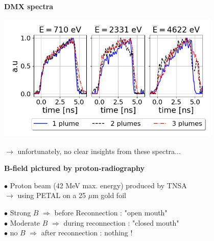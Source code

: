 \documentclass[landscape]{slides}
\begin{document}
\begin{slide}
{\large \textbf{DMX spectra}}

\begin{center}
\includegraphics[width=0.8\textwidth]{fig_DMX.png}
\end{center}

$\to$ unfortunately, no clear insights from these spectra...

\end{slide}



\begin{slide}
{\large \textbf{B-field pictured by proton-radiography}}

$\bullet$ Proton beam (42 MeV max. energy) produced by TNSA \\
$\to$ using PETAL on a 25 $\mu$m gold foil



$\bullet$ Strong $B$ $\Rightarrow$ before Reconnection : "open mouth" \\
$\bullet$ Moderate $B$ $\Rightarrow$ during reconnection : "closed mouth" \\
$\bullet$ no $B$ $\Rightarrow$ after reconnection : nothing ! \\

\end{slide}
\end{document}
